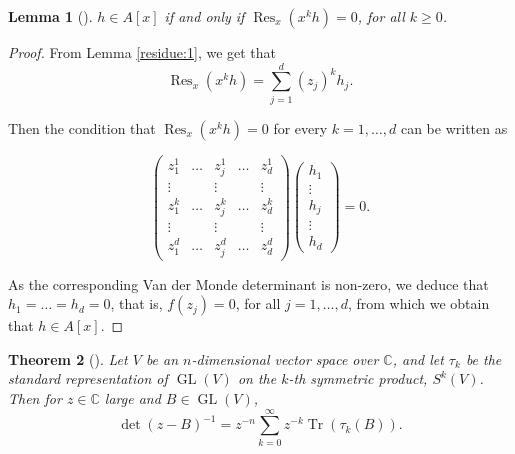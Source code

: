 \documentclass{article}
\newtheorem{theorem}{Theorem}[section]
\newtheorem{lemma}[theorem]{Lemma}
\newcommand{\CC}{\mathbb{C}}
\DeclareMathOperator{\Tr}{Tr}
\DeclareMathOperator{\Res}{Res}
\DeclareMathOperator{\GL}{GL}
\begin{document}
	\begin{lemma}[\cite{Guillemin1999}]\label{residue:2}
		$h \in A[x]$ if and only if $\Res_{x}(x^{k}h) = 0$, for all $k \geq 0$.
	\end{lemma}
	
	\begin{proof}
		From Lemma \ref{residue:1}, we get that
		\begin{equation*}
			\Res_{x}(x^{k}h) = \sum_{j = 1}^{d} (z_{j})^{k} h_{j}.
		\end{equation*}
		
		Then the condition that $\Res_{x}(x^{k}h) = 0$ for every $k = 1, \ldots, d$ can be written as
		
		\begin{equation*}
			\begin{pmatrix}
				z_{1}^{1} & \ldots & z_{j}^{1} & \ldots & z_{d}^{1} \\
				\vdots & & \vdots & & \vdots \\
				z_{1}^{k} & \ldots & z_{j}^{k} & \ldots & z_{d}^{k} \\
				\vdots & & \vdots & & \vdots \\
				z_{1}^{d} & \ldots & z_{j}^{d} & \ldots & z_{d}^{d}
			\end{pmatrix}
			\begin{pmatrix}
				h_{1} \\ \vdots \\ h_{j} \\ \vdots \\ h_{d}
			\end{pmatrix}
			= 0.
		\end{equation*}
	
		As the corresponding Van der Monde determinant is non-zero, we deduce that $h_{1} = \ldots = h_{d} = 0$, that is, $f(z_{j}) = 0$, for all $j = 1, \ldots, d$, from which we obtain that $h \in A[x]$.
	\end{proof}
	
	\begin{theorem}[\cite{CanasdaSilva1996}]\label{residue:3}
		Let $V$ be an $n$-dimensional vector space over $\CC$, and let $\tau_{k}$ be the standard representation of $\GL(V)$ on the $k$-th symmetric product, $S^{k}(V)$. Then for $z \in \CC$ large and $B \in \GL(V)$,
		\begin{equation*}
			\det(z - B)^{-1} = z^{-n}\sum\limits_{k=0}^{\infty} z^{-k} \Tr(\tau_{k}(B)).
		\end{equation*}
	\end{theorem}
\end{document}
